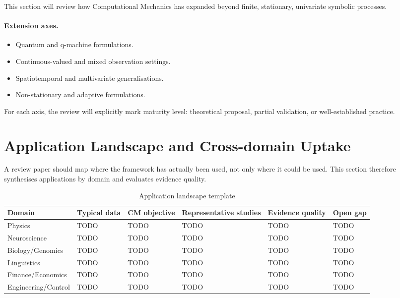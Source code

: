 \documentclass[11pt,twocolumn]{article}
\begin{document}
This section will review how Computational Mechanics has expanded beyond finite, stationary, univariate symbolic processes.

\paragraph{Extension axes.}
\begin{itemize}[nosep]
    \item Quantum and q-machine formulations.
    \item Continuous-valued and mixed observation settings.
    \item Spatiotemporal and multivariate generalisations.
    \item Non-stationary and adaptive formulations.
\end{itemize}

For each axis, the review will explicitly mark maturity level: theoretical proposal, partial validation, or well-established practice.

\section{Application Landscape and Cross-domain Uptake}
\label{sec:applications}

A review paper should map where the framework has actually been used, not only where it could be used.
This section therefore synthesises applications by domain and evaluates evidence quality.

\begin{table}[t]
\centering
\caption{Application landscape template}
\label{tab:application-landscape}
\small
\begin{tabular}{llllll}
\toprule
Domain & Typical data & CM objective & Representative studies & Evidence quality & Open gap \\
\midrule
Physics & TODO & TODO & TODO & TODO & TODO \\
Neuroscience & TODO & TODO & TODO & TODO & TODO \\
Biology/Genomics & TODO & TODO & TODO & TODO & TODO \\
Linguistics & TODO & TODO & TODO & TODO & TODO \\
Finance/Economics & TODO & TODO & TODO & TODO & TODO \\
Engineering/Control & TODO & TODO & TODO & TODO & TODO \\
\bottomrule
\end{tabular}
\end{table}
\end{document}
